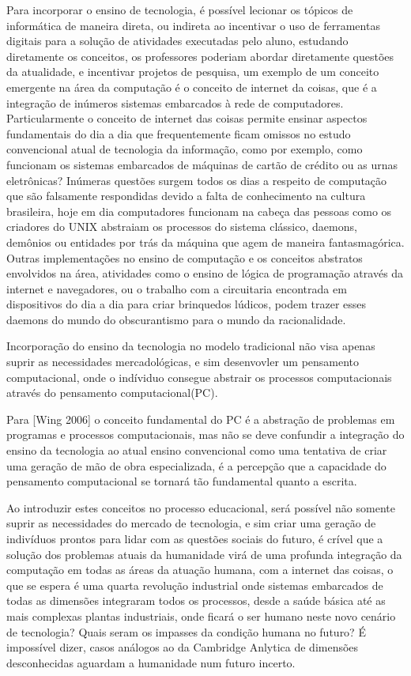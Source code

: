 \documentclass[article, 11pt, oneside, a4paper, english, brazil, sumario=tradicional]{abntex2}
\begin{document}
    Para incorporar o ensino de tecnologia, é possível lecionar os tópicos de informática de maneira direta, ou indireta
ao incentivar o uso de ferramentas digitais para a solução de atividades executadas
pelo aluno, estudando diretamente os conceitos, os professores poderiam abordar
diretamente questões da atualidade, e incentivar projetos de pesquisa, um
exemplo de um conceito emergente na área da computação é o conceito de internet
da coisas, que é a integração de inúmeros sistemas embarcados à rede de computadores.
    Particularmente o conceito de internet das coisas permite ensinar
aspectos fundamentais do dia a dia que frequentemente ficam omissos no estudo
convencional atual de tecnologia da informação, como por exemplo, como funcionam
os sistemas embarcados de máquinas de cartão de crédito ou as urnas eletrônicas?
Inúmeras questões surgem todos os dias a respeito de computação que são
falsamente respondidas devido a falta de conhecimento na cultura brasileira,
hoje em dia computadores funcionam  na cabeça das pessoas como os criadores do
UNIX abstraiam os processos do sistema clássico, daemons, demônios ou entidades
por trás da máquina que agem de maneira fantasmagórica.  Outras implementações
no ensino de computação e os conceitos abstratos envolvidos na área, atividades
como o ensino de lógica de programação através da internet e navegadores, ou o
trabalho com a circuitaria encontrada em dispositivos do dia a dia para criar
brinquedos lúdicos, podem trazer esses daemons do mundo do obscurantismo para o
mundo da racionalidade.

    Incorporação do ensino da tecnologia no modelo tradicional não visa apenas suprir
as necessidades mercadológicas, e sim desenvovler um pensamento computacional, onde o indíviduo
consegue abstrair os processos computacionais através do pensamento computacional(PC).

    Para [Wing 2006] o conceito fundamental do PC é a abstração
de problemas em programas e processos computacionais, mas não se deve confundir
a integração
do ensino da tecnologia ao atual ensino convencional como uma tentativa de criar
uma geração
de mão de obra especializada, é a percepção que a capacidade do pensamento
computacional se tornará
tão fundamental quanto a escrita.

    Ao introduzir estes conceitos no processo educacional, será possível não
    somente suprir as necessidades do mercado de tecnologia, e sim criar uma
    geração de indivíduos prontos para lidar com as questões sociais do futuro,
    é crível que a solução dos problemas atuais da humanidade virá de uma
    profunda integração da computação em todas as áreas da atuação humana, com a
    internet das coisas, o que se espera é uma quarta revolução industrial onde
    sistemas embarcados de todas as dimensões integraram todos os processos,
    desde a saúde básica até as mais complexas plantas industriais, onde ficará
    o ser humano neste novo cenário de tecnologia? Quais seram os impasses da
    condição humana no futuro? É impossível dizer, casos análogos ao da
    Cambridge Anlytica de dimensões desconhecidas aguardam a humanidade num
    futuro incerto.
\end{document}
